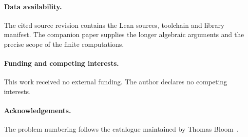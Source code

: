 \documentclass[11pt]{article}
\begin{document}
\paragraph{Data availability.}
The cited source revision contains the Lean sources, toolchain and
library manifest. The companion paper supplies the longer algebraic
arguments and the precise scope of the finite computations.

\paragraph{Funding and competing interests.}
This work received no external funding. The author declares no
competing interests.

\paragraph{Acknowledgements.}
The problem numbering follows the catalogue maintained by Thomas
Bloom~\cite{erdosproblems}.
\end{document}
